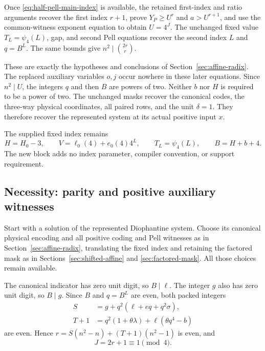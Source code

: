 Once \eqref{eq:half-pell-main-index} is available, the retained
first-index and ratio arguments recover the first index $r+1$,
prove $Y_P\ge U^r$ and $a>U^{r+1}$, and use the common-witness
exponent equation to obtain $U=4^J$. The unchanged fixed value
$T_L=\psi_4(L)$, gap, and second Pell equations recover the second
index $L$ and $q=B^L$. The same bounds give
$n^2\mid\binom{2r}{r}$.

These are exactly the hypotheses and conclusions of
Section~\ref{sec:affine-radix}. The replaced auxiliary variables
$o,j$ occur nowhere in these later equations. Since $n^2\mid U$,
the integers $q$ and then $B$ are powers of two. Neither $b$ nor
$H$ is required to be a power of two. The unchanged masks recover
the canonical codes, the three-way physical coordinates, all paired
rows, and the unit $\delta=1$. They therefore recover the represented
system at its actual positive input $x$.

The supplied fixed index remains
\[
 H=H_0-3,\qquad V=\ell_0(4)+e_0(4)4^L,\qquad
 T_L=\psi_4(L),\qquad B=H+b+4.
\]
The new block adds no index parameter, compiler convention, or
support requirement.

\subsection{Necessity: parity and positive auxiliary witnesses}

Start with a solution of the represented Diophantine system. Choose
its canonical physical encoding and all positive coding and Pell
witnesses as in Section~\ref{sec:affine-radix}, translating the
fixed index and retaining the factored mask as in
Sections~\ref{sec:shifted-affine} and \ref{sec:factored-mask}.
All those choices remain available.

The canonical indicator has zero unit digit, so $B\mid\ell$.
The integer $g$ also has zero unit digit, so $B\mid g$.
Since $B$ and $q=B^L$ are even, both packed integers
\[
 \begin{aligned}
 S&=g+q^2(\ell+eq+q^2\sigma),\\
 T+1&=q^2(1+\theta\lambda)+\ell(\theta q^4-b)
 \end{aligned}
\]
are even. Hence $r=S(n^2-n)+(T+1)(n^2-1)$ is even, and
\begin{equation}\label{eq:half-pell-necessity-parity}
 J=2r+1\equiv1\pmod4.
\end{equation}

